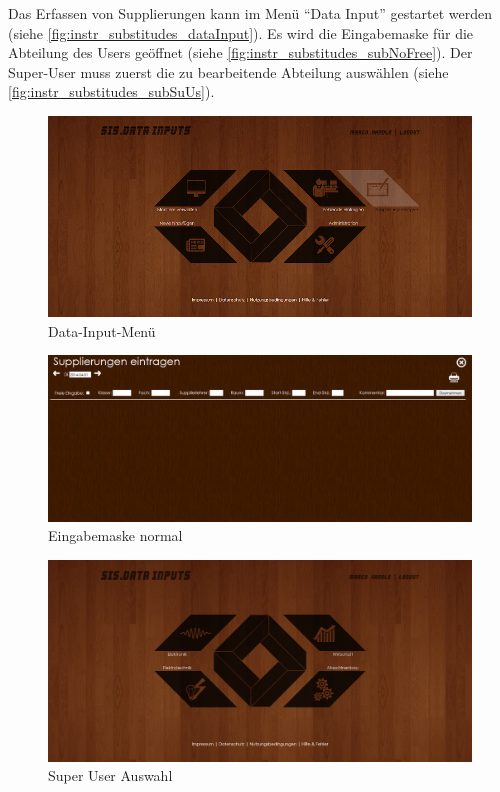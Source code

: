 Das Erfassen von Supplierungen kann im Menü \enquote{Data Input} gestartet werden (siehe \autoref{fig:instr_substitudes_dataInput}). Es wird die Eingabemaske für die Abteilung des Users geöffnet (siehe \autoref{fig:instr_substitudes_subNoFree}). Der Super-User muss zuerst die zu bearbeitende Abteilung auswählen (siehe \autoref{fig:instr_substitudes_subSuUs}).
\begin{figure}[H]
\centering
\includegraphics[keepaspectratio=true, width=17cm]{images/screenshots/data-inputs_substitudes.png}
\caption{Data-Input-Menü}
\label{fig:instr_substitudes_dataInput}
\end{figure}
\begin{figure}[H]
\centering
\includegraphics[keepaspectratio=true, width=17cm]{images/screenshots/substitudes_nofree.png}
\caption{Eingabemaske normal}
\label{fig:instr_substitudes_subNoFree}
\end{figure}
\begin{figure}[H]
\centering
\includegraphics[keepaspectratio=true, width=17cm]{images/screenshots/substitudes_sections.png}
\caption{Super User Auswahl}
\label{fig:instr_substitudes_subSuUs}
\end{figure}

